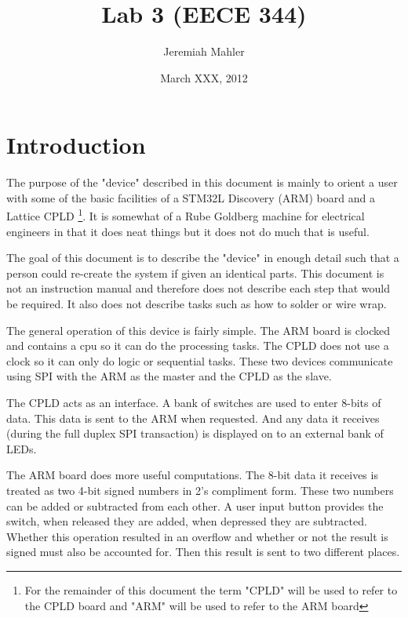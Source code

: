 \documentclass{article}
\begin{document}

\title{Lab 3 (EECE 344)}
\date{March XXX, 2012}
\author{Jeremiah Mahler}

\maketitle

\tableofcontents

\pagebreak

\section{Introduction}

The purpose of the "device" described in this document is mainly
to orient a user with some of the basic facilities of a STM32L Discovery\citep{UM1079}
(ARM) board and a Lattice CPLD\cite{EB66}
\footnote{For the remainder of this document the term "CPLD" will
be used to refer to the CPLD board and "ARM" will be used to
refer to the ARM board}.
It is somewhat of a Rube Goldberg machine for electrical engineers
in that it does neat things but it does not do much that is useful.

The goal of this document is to describe the "device" in enough
detail such that a person could re-create the system if given
an identical parts.
This document is not an instruction manual and therefore does not
describe each step that would be required.
It also does not describe tasks such as how to solder or wire wrap.

The general operation of this device is fairly simple.
The ARM board is clocked and contains a cpu so it can do the processing
tasks.
The CPLD does not use a clock so it can only do logic or sequential tasks.
These two devices communicate using SPI with the ARM as the master and
the CPLD as the slave.

The CPLD acts as an interface.
A bank of switches are used to enter 8-bits of data.
This data is sent to the ARM when requested.
And any data it receives (during the full duplex SPI transaction)
is displayed on to an external bank of LEDs.

The ARM board does more useful computations.
The 8-bit data it receives is treated as two 4-bit signed numbers
in 2's compliment form.
These two numbers can be added or subtracted from each other.
A user input button provides the switch, when released they are
added, when depressed they are subtracted.
Whether this operation resulted in an overflow and whether or
not the result is signed must also be accounted for.
Then this result is sent to two different places.
\end{document}

